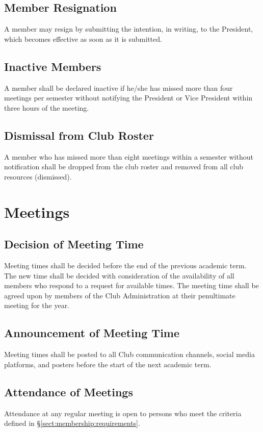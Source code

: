 \documentclass[english,11pt]{article}
\begin{document}
\subsection{Member Resignation} \label{sect:membership:resignation}
A member may resign by submitting the intention, in writing, to the President, which becomes effective as soon as it is submitted.

\subsection{Inactive Members} \label{sect:membership:inactive}
A member shall be declared inactive if he/she has missed more than four meetings per semester without notifying the President or Vice President within three hours of the meeting.

\subsection{Dismissal from Club Roster} \label{sect:membership:dismissal}
A member who has missed more than eight meetings within a semester without notification shall be dropped from the club roster and removed from all club resources (dismissed).

\section{Meetings} \label{art:meetings}
\subsection{Decision of Meeting Time} \label{sect:meetings:decision}
Meeting times shall be decided before the end of the previous academic term.
The new time shall be decided with consideration of the availability of all members who respond to a request for available times.
The meeting time shall be agreed upon by members of the Club Administration at their penultimate meeting for the year.

\subsection{Announcement of Meeting Time} \label{sect:meetings:announcement}
Meeting times shall be posted to all Club communication channels, social media platforms, and posters before the start of the next academic term.

\subsection{Attendance of Meetings} \label{sect:meetings:attendance}
Attendance at any regular meeting is open to persons who meet the criteria defined in §\ref{sect:membership:requirements}.
\end{document}

